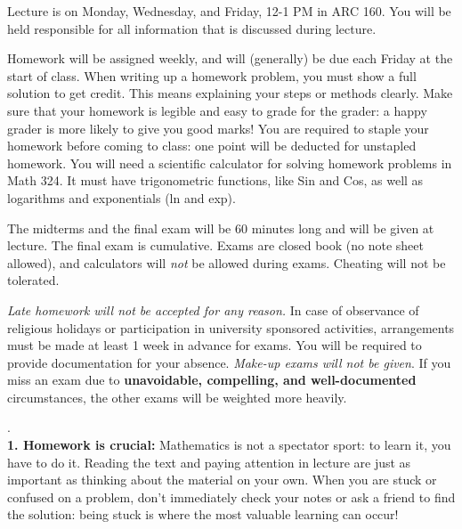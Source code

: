 \documentclass[11 pt]{report}
\begin{document}
\vspace{0.25cm}

  Lecture is on Monday, Wednesday, and Friday, 12-1 PM in ARC 160.  You
will be held responsible for all information that is discussed
during lecture.
\vspace{0.25cm}

  Homework will be assigned weekly, and will (generally) be due each Friday at the start of class. When writing up a homework problem, you must show a full solution to get credit. This means explaining your steps or methods clearly. Make sure that your homework is legible and easy to grade for the grader: a happy grader is more likely to give you good marks! You are required to staple your homework before coming to class: one point will be deducted for unstapled homework. You will need a scientific calculator for solving homework problems in Math 324.  It must have trigonometric functions, like
Sin and Cos, as well as logarithms and exponentials (ln and exp).
\vspace{0.25cm}


  The midterms and the final exam will be 60 minutes long and
will be given at lecture.  The final exam is cumulative. Exams are closed book (no note sheet allowed), 
and calculators will \emph{not} be allowed during exams. Cheating will not be tolerated. 

\vspace{.25cm}

  \emph{Late homework will not be accepted
for any reason.}  In case of observance of religious holidays or
participation in university sponsored activities, arrangements must
be made at least 1 week in advance for exams. You will be required
to provide documentation for your absence. \emph{Make-up exams will
not be given}.  If you miss an exam due to {\bf unavoidable,
compelling, and well-documented} circumstances, the other exams will
be weighted more heavily. \vspace{0.25cm}

\newpage 

. \\
{\bf1.  Homework is crucial:} Mathematics is not a spectator sport: to learn it, you have to do it.
Reading the text and paying attention in lecture are just as important as thinking about
the material on your own. When you are stuck or confused on a problem, don't immediately check your notes or 
ask a friend to find the solution: being stuck is where the most valuable learning can occur! 
\end{document}
